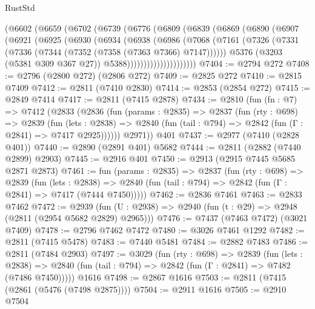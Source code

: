 \begin{lexlean}{RustStd}
\begin{coremodule}
          (@6602
            (@6659
              (@6702
                (@6739
                  (@6776
                    (@6809
                      (@6839
                        (@6869
                          (@6890
                            (@6907
                              (@6921
                                (@6925
                                  (@6930
                                    (@6934
                                      (@6938
                                        (@6986
                                          (@7068
                                            (@7161
                                              (@7326
                                                (@7331
                                                  (@7336
                                                    (@7344 (@7352 (@7358 (@7363 @7366) @7147))))))
                                              @5376
                                              (@3203 (@5381 @309 @367 @27))
                                              @5388)))))))))))))))))))))
@7404 := @2794 @272
@7408 := @2796 (@2800 @272) (@2806 @272)
@7409 := @2825 @272
@7410 := @2815 @7409
@7412 := @2811 (@7410 @2830)
@7414 := @2853 (@2854 @272)
@7415 := @2849 @7414
@7417 := @2811 (@7415 @2878)
@7434 := @2810
    (fun (fn : @7) =>
    @7412
      (@2833
        (@2836
          (fun (params : @2835) =>
          @2837
            (fun (rty : @698) =>
            @2839
              (fun (lets : @2838) =>
              @2840 (fun (tail : @794) => @2842 (fun (Γ : @2841) => @7417 @2925))))))
        @2971))
    @401
@7437 := @2977 (@7410 (@2828 @401))
@7440 := @2890 (@2891 @401) @5682
@7444 := @2811 (@2882 (@7440 @2899) @2903)
@7445 := @2916 @401
@7450 := @2913 (@2915 @7445 @5685 @2871 @2873)
@7461 := fun (params : @2835) =>
  @2837
    (fun (rty : @698) =>
    @2839
      (fun (lets : @2838) =>
      @2840 (fun (tail : @794) => @2842 (fun (Γ : @2841) => @7417 (@7444 @7450)))))
@7462 := @2836 @7461
@7463 := @2833 @7462
@7472 := @2939 (fun (U : @2938) => @2940 (fun (t : @29) => @2948 (@2811 (@2954 @5682 @2829) @2965)))
@7476 := @7437 (@7463 @7472) (@3021 @7409)
@7478 := @2796 @7462 @7472
@7480 := @3026 @7461 @1292
@7482 := @2811 (@7415 @5478)
@7483 := @7440 @5481
@7484 := @2882 @7483
@7486 := @2811 (@7484 @2903)
@7497 := @3029
    (fun (rty : @698) =>
    @2839
      (fun (lets : @2838) =>
      @2840 (fun (tail : @794) => @2842 (fun (Γ : @2841) => @7482 (@7486 @7450)))))
    @1616
@7498 := @2867 @1616
@7503 := @2811 (@7415 (@2861 (@5476 (@7498 @2875))))
@7504 := @2911 @1616
@7505 := @2910 @7504

\end{coremodule}
\end{lexlean}
